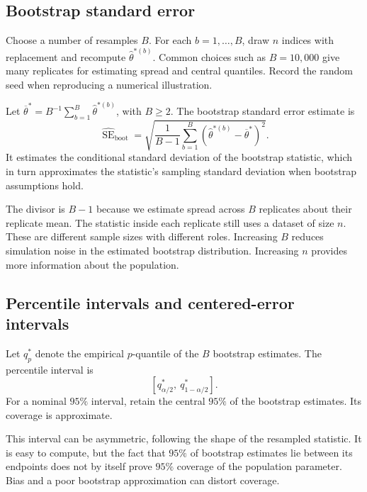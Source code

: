\subsection{Bootstrap standard error}

Choose a number of resamples \(B\). For each
\(b=1,\ldots,B\), draw \(n\) indices with replacement and recompute
\(\widehat\theta^{*(b)}\). Common choices such as \(B=10{,}000\)
give many replicates for estimating spread and central quantiles.
Record the random seed when reproducing a numerical illustration.

\begin{definition}
Let \(\overline\theta^*=B^{-1}\sum_{b=1}^B\widehat\theta^{*(b)}\),
with \(B\ge2\). The bootstrap standard error estimate is
\[
  \widehat{\operatorname{SE}}_{\mathrm{boot}}
  =\sqrt{\frac1{B-1}\sum_{b=1}^B
    (\widehat\theta^{*(b)}-\overline\theta^*)^2}.
\]
It estimates the conditional standard deviation of the bootstrap
statistic, which in turn approximates the statistic's sampling
standard deviation when bootstrap assumptions hold.
\end{definition}

The divisor is \(B-1\) because we estimate spread across \(B\)
replicates about their replicate mean. The statistic inside each
replicate still uses a dataset of size \(n\). These are different
sample sizes with different roles. Increasing \(B\) reduces simulation
noise in the estimated bootstrap distribution. Increasing \(n\)
provides more information about the population.

\subsection{Percentile intervals and centered-error intervals}

\begin{definition}
Let \(q_p^*\) denote the empirical \(p\)-quantile of the
\(B\) bootstrap estimates. The percentile interval is
\[
  [q_{\alpha/2}^*,\ q_{1-\alpha/2}^*].
\]
For a nominal \(95\%\) interval, retain the central \(95\%\) of
the bootstrap estimates. Its coverage is approximate.
\end{definition}

This interval can be asymmetric, following the shape of the resampled
statistic. It is easy to compute, but the fact that \(95\%\) of
bootstrap estimates lie between its endpoints does not by itself prove
\(95\%\) coverage of the population parameter. Bias and a poor
bootstrap approximation can distort coverage.

